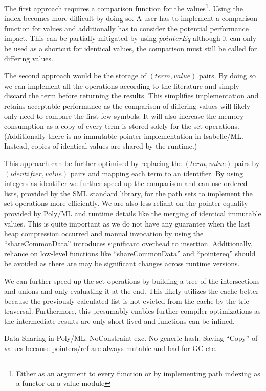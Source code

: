 The first approach requires a comparison function for the values\footnote{Either as an argument to every function or by implementing path indexing as a functor on a value module}. Using the index becomes more difficult by doing so. A user has to implement a comparison function for values and additionally has to consider the potential performance impact. This can be partially mitigated by using $pointerEq$ although it can only be used as a shortcut for identical values, the comparison must still be called for differing values.

The second approach would be the storage of $(term, value)$ pairs. By doing so we can implement all the operations according to the literature and simply discard the term before returning the results. This simplifies implementation and retains acceptable performance as the comparison of differing values will likely only need to compare the first few symbols. It will also increase the memory consumption as a copy of every term is stored solely for the set operations. (Additionally there is no immutable pointer implementation in Isabelle/ML. Instead, copies of identical values are shared by the runtime.)

This approach can be further optimised by replacing the $(term, value)$ pairs by $(identifier, value)$ pairs and mapping each term to an identifier. By using integers as identifier we further speed up the comparison and can use ordered lists, provided by the SML standard library, for the path sets to implement the set operations more efficiently. We are also less reliant on the pointer equality provided by Poly/ML and runtime details like the merging of identical immutable values. This is quite important as we do not have any guarantee when the last heap compression occurred and manual invocation by using the ``shareCommonData'' introduces significant overhead to insertion. Additionally, reliance on low-level functions like ``shareCommonData'' and ``pointereq'' should be avoided as there are may be significant changes across runtime versions.

We can further speed up the set operations by building a tree of the intersections and unions and only evaluating it at the end. This likely utilizes the cache better because the previously calculated list is not evicted from the cache by the trie traversal. Furthermore, this presumably enables further compiler optimizations as the intermediate results are only short-lived and functions can be inlined.

Data Sharing in Poly/ML. NoConstraint exc. No generic hash. Saving ``Copy'' of values because pointers/ref are always mutable and bad for GC etc.

